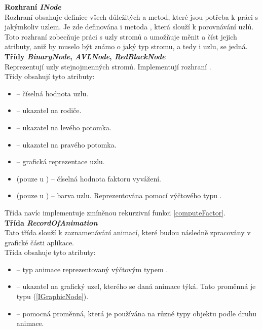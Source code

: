 \documentclass[
  biblatex=false,
  font=serif,
  glossaries=false,
  tables=false,
  theorems=false,
  index
]{kidiplom}
\begin{document}
\noindent \textbf{Rozhraní \textit{INode}}\\
\indent Rozhraní  obsahuje definice všech důležitých  a  metod, které jsou potřeba k práci s jakýmkoliv uzlem. Je zde definována i metoda , která slouží k porovnávání uzlů. Toto rozhraní zobecňuje práci s uzly stromů a umožňuje měnit a číst jejich atributy, aniž by muselo být známo o jaký typ stromu, a tedy i uzlu, se jedná.\\

\noindent \textbf{Třídy \textit{BinaryNode}, \textit{AVLNode}, \textit{RedBlackNode}}\\
\indent Reprezentují uzly stejnojmenných stromů. Implementují rozhraní .\\
\noindent Třídy obsahují tyto atributy:
\begin{itemize}
\item {} -- číselná hodnota uzlu.
\item {} -- ukazatel na rodiče.
\item {} -- ukazatel na levého potomka.
\item {} -- ukazatel na pravého potomka.
\item {} -- grafická reprezentace uzlu.
\item {}(pouze u ) -- číselná hodnota faktoru vyvážení.
\item {}(pouze u ) -- barva uzlu. Reprezentována pomocí výčtového typu .
\end{itemize}

\noindent Třída  navíc implementuje zmíněnou rekurzivní funkci  \ref{computeFactor}.\\

\noindent \textbf{Třída \textit{RecordOfAnimation}}\\
\indent Tato třída slouží k zaznamenávání animací, které budou následně zpracovány v grafické části aplikace.\\
\noindent Třída obsahuje tyto atributy: 
\begin{itemize}
\item {} -- typ animace reprezentovaný výčtovým typem .
\item {} -- ukazatel na grafický uzel, kterého se daná animace týká. Tato proměnná je typu  (\ref{IGraphicNode}).
\item {} -- pomocná proměnná, která je používána na různé typy objektu podle druhu animace.
\end{itemize}
\end{document}
